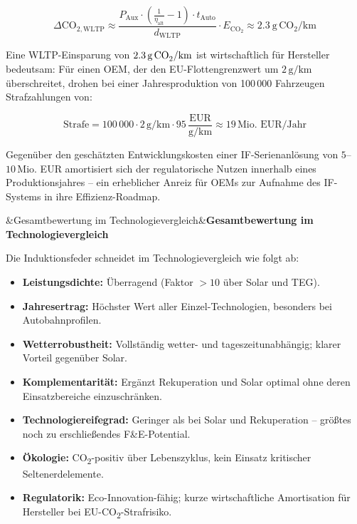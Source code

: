 ﻿\documentclass[12pt, a4paper]{report}
\newenvironment{ergebnis}[1][]{%
  \begin{ergebnisframe}\sloppy%
  \ifx&#1&\else\textbf{#1}\par\smallskip\fi}{\end{ergebnisframe}}
\theoremstyle{definition}
\theoremstyle{remark}
\begin{document}
\begin{equation}
  \Delta \text{CO}_{2,\text{WLTP}} \approx
  \frac{P_{\text{Aux}} \cdot \left(\frac{1}{\eta_{\text{alt}}} - 1\right) \cdot t_{\text{Auto}}}{d_{\text{WLTP}}}
  \cdot E_{\text{CO}_2}
  \approx \SI{2.3}{\gram\,\text{CO}_2\per\kilo\metre}
  \label{eq:co2_wltp}
\end{equation}

Eine WLTP-Einsparung von $2.3\,\text{g\,CO}_2/\text{km}$ ist wirtschaftlich
für Hersteller bedeutsam: Für einen OEM, der den EU-Flottengrenzwert um
$2\,\text{g/km}$ überschreitet, drohen bei einer Jahresproduktion von
100\,000 Fahrzeugen Strafzahlungen von:

\begin{equation}
  \text{Strafe} = 100\,000 \cdot 2\,\text{g/km} \cdot 95\,\frac{\text{EUR}}{\text{g/km}}
  \approx 19\,\text{Mio.~EUR/Jahr}
  \label{eq:strafe_eu}
\end{equation}

Gegenüber den geschätzten Entwicklungskosten einer IF-Serienanlösung von
$5$--$10\,\text{Mio.}$ EUR amortisiert sich der regulatorische Nutzen
innerhalb eines Produktionsjahres -- ein erheblicher Anreiz für OEMs zur
Aufnahme des IF-Systems in ihre Effizienz-Roadmap.

\begin{ergebnis}[Gesamtbewertung im Technologievergleich]
  Die Induktionsfeder schneidet im Technologievergleich wie folgt ab:
  \begin{itemize}
    \item \textbf{Leistungsdichte:} Überragend (Faktor $> 10$ über Solar und TEG).
    \item \textbf{Jahresertrag:} Höchster Wert aller Einzel-Technologien, besonders
          bei Autobahnprofilen.
    \item \textbf{Wetterrobustheit:} Vollständig wetter- und tageszeitunabhängig;
          klarer Vorteil gegenüber Solar.
    \item \textbf{Komplementarität:} Ergänzt Rekuperation und Solar optimal
          ohne deren Einsatzbereiche einzuschränken.
    \item \textbf{Technologiereifegrad:} Geringer als bei Solar und Rekuperation
          -- größtes noch zu erschließendes F\&E-Potential.
    \item \textbf{Ökologie:} CO\textsubscript{2}-positiv über Lebenszyklus,
          kein Einsatz kritischer Seltenerdelemente.
    \item \textbf{Regulatorik:} Eco-Innovation-fähig; kurze wirtschaftliche
          Amortisation für Hersteller bei EU-CO\textsubscript{2}-Strafrisiko.
  \end{itemize}
\end{ergebnis}
\end{document}
